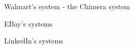 Walmart's system - the Chimera system \cite{Sun14}

EBay's systems \cite{Shen11,Shen12,Yu13:EBay}

LinkedIn's systems \cite{Bekkerman11}

\vspace{7cm}